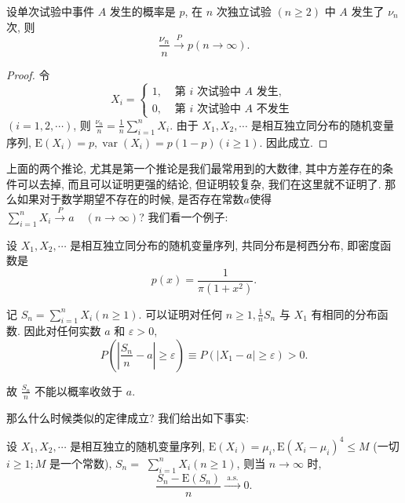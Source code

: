 \begin{corollary}
    设单次试验中事件 $A$ 发生的概率是 $p$, 在 $n$ 次独立试验 $(n \geqslant 2)$ 中 $A$ 发生了 $\nu_n$ 次, 则
$$
\frac{\nu_n}{n} \stackrel{P}{\longrightarrow} p(n \rightarrow \infty) .
$$
\end{corollary}

\begin{proof}令
$$
X_i= \begin{cases}1, & \text { 第 } i \text { 次试验中 } A \text { 发生, } \\ 0, & \text { 第 } i \text { 次试验中 } A \text { 不发生 }\end{cases}
$$
$(i=1,2, \cdots)$, 则 $\frac{\nu_n}{n}=\frac{1}{n} \sum_{i=1}^n X_i$. 由于 $X_1, X_2, \cdots$ 是相互独立同分布的随机变量序列, $\mathrm{E}\left(X_i\right)=p, \operatorname{var}\left(X_i\right)=p(1-p)(i \geqslant 1)$. 因此成立.
\end{proof}

上面的两个推论, 尤其是第一个推论是我们最常用到的大数律, 其中方差存在的条件可以去掉, 而且可以证明更强的结论, 但证明较复杂, 我们在这里就不证明了. 那么如果对于数学期望不存在的时候, 是否存在常数$a$使得$\sum_{i=1}^n X_i \stackrel{P}{\longrightarrow} a \quad(n \rightarrow \infty)$? 我们看一个例子: 

\begin{example}
    设 $X_1, X_2, \cdots$ 是相互独立同分布的随机变量序列, 共同分布是柯西分布, 即密度函数是
$$
p(x)=\frac{1}{\pi\left(1+x^2\right)} .
$$

记 $S_n=\sum_{i=1}^n X_i(n \geqslant 1)$. 可以证明对任何 $n \geqslant 1, \frac{1}{n} S_n$ 与 $X_1$ 有相同的分布函数. 因此对任何实数 $a$ 和 $\varepsilon>0$,
$$
P\left(\left|\frac{S_n}{n}-a\right| \geqslant \varepsilon\right) \equiv P\left(\left|X_1-a\right| \geqslant \varepsilon\right)>0 .
$$

故 $\frac{S_n}{n}$ 不能以概率收敛于 $a$.
\end{example}

那么什么时候类似的定律成立? 我们给出如下事实: 

\begin{theorem}
      设 $X_1, X_2, \cdots$ 是相互独立的随机变量序列, $\mathrm{E}\left(X_i\right)=\mu_i, \mathrm{E}\left(X_i-\mu_i\right)^4 \leq M$ (一切 $i \geqslant 1 ; M$ 是一个常数), $S_n=$ $\sum_{i=1}^n X_i(n \geqslant 1)$, 则当 $n \rightarrow \infty$ 时,
$$
\frac{S_n-\mathrm{E}\left(S_n\right)}{n} \stackrel{\text { a.s. }}{\longrightarrow} 0 .
$$
\end{theorem}

